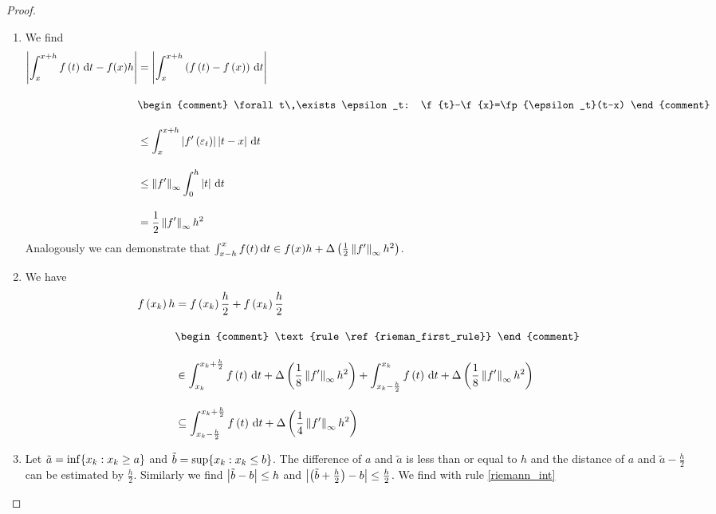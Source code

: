 \begin{proof}~
  \begin{enumerate}
    \item We find
      \begin{align}
        \abs{\int_x^{x+h} \f{t} \d{t} - f(x)h} &= \abs{\int_x^{x+h} \br{\f{t}-\f{x}} \d{t} } \bnl
        &
        \begin{comment}
          \forall t\,\exists \epsilon_t: \f{t}-\f{x}=\fp{\epsilon_t}(t-x)
        \end{comment} \bnl
        & \le \int_{x}^{x+h} \abs{\fp{\epsilon_t}} \abs{t-x} \d{t} \bnl
        & \le \snorm{f'} \int_{0}^{h} \abs{t} \d{t} \bnl
        & = \frac 12 \snorm{f'} h^2
      \end{align}
      Analogously we can demonstrate that $\int_{x-h}^x f(t) \,\mathrm d{t} \in f(x) h + \Delta\left( {\frac 12 \left\|{f'}\right\|_\infty h^2} \right)$.

    \item We have
      \begin{align}
        \f{\x} h & = \f{\x} \frac h2 + \f{\x} \frac h2 \bnl
        &
        \begin{comment}
          \text{rule \ref{rieman_first_rule}}
        \end{comment} \bnl
        &\in \int_{\x}^{\x+\frac h2} \f{t}\d{t} + \bigabs{\frac 18 \snorm{f'} h^2} + \int_{\x-\frac h2}^{\x} \f{t}\d{t} + \bigabs{\frac 18 \snorm{f'} h^2} \bnl
        &\subseteq \int_{\x-\frac h2}^{\x+\frac h2} \f{t}\d{t} + \bigabs{\frac 14 \snorm{f'} h^2}
      \end{align}

    \item Let $\tilde a = \inf \{ x_{k} : x_{k} \ge a \}$ and $\tilde b = \sup \{ x_{k} : x_{k} \le b \}$. The difference of $a$ and $\tilde a$ is less than or equal to $h$ and the distance of $a$ and $\tilde a - \frac h2$ can be estimated by $\frac h2$. Similarly we find $\left|{\tilde b-b}\right| \le h$ and $\left|{\left( {\tilde b+\frac h2} \right)-b}\right| \le \frac h2$. We find with rule \ref{riemann_int}


\end{enumerate}
\end{proof}
